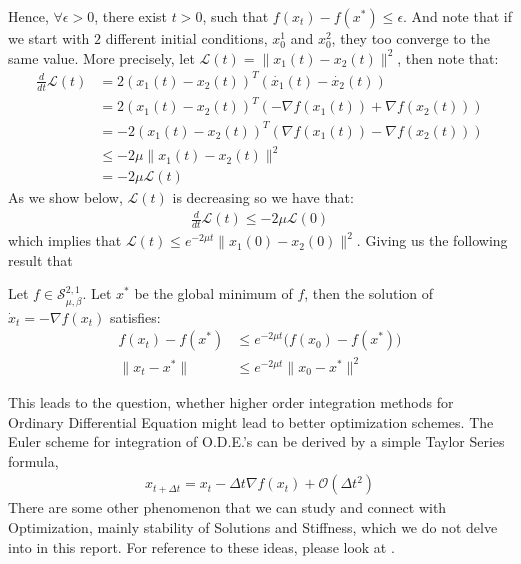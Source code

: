 Hence, $\forall \epsilon >0$, there exist $t>0$, such that $f(x_t) - f(x^*) \leq \epsilon$. And note that if we start with $2$ different initial conditions, $x_0^1$ and $x_0^2$, they too converge to the same value. More precisely, let $\mathcal{L}(t)= \| x_1 (t) - x_2 (t) \|^2$, then note that:
\begin{equation}
\begin{aligned}
\frac{d}{dt}\mathcal{L}(t) &= 2 (x_1(t) - x_2(t))^T (\dot{x_1}(t) - \dot{x_2}(t)) \\
&= 2 (x_1(t) - x_2(t))^T (-\nabla f(x_1(t)) + \nabla f(x_2(t))) \\
& = - 2 (x_1(t) - x_2(t))^T (\nabla f(x_1(t)) - \nabla f(x_2(t))) \\
& \leq - 2 \mu \| x_1(t) - x_2(t) \|^2 \\
&= -2 \mu \mathcal{L}(t)
\end{aligned}
\end{equation}
As we show below, $\mathcal{L}(t)$ is decreasing so we have that:
\begin{equation}
\begin{aligned}
\frac{d}{dt}\mathcal{L}(t) \leq - 2 \mu \mathcal{L}(0)
\end{aligned}
\end{equation}
which implies that $\mathcal{L}(t) \leq e^{-2 \mu t} \| x_1(0) - x_2(0) \|^2$. Giving us the following result that
\begin{prop}
Let $f \in \mathcal{S}_{\mu, \beta}^{2,1}$. Let $x^*$ be the global minimum of $f$, then the solution of $\dot{x}_t = -\nabla f(x_t)$ satisfies:
\begin{align*}
f(x_t) - f(x^*) &\leq e^{-2 \mu t} \big( f(x_0) - f(x^*) \big) \\
\| x_t - x^* \| &\leq e^{-2 \mu t} \| x_0 - x^* \|^2
\end{align*}
\end{prop}

This leads to the question, whether higher order integration methods for Ordinary Differential Equation might lead to better optimization schemes. The Euler scheme for integration of O.D.E.'s can be derived by a simple Taylor Series formula,
\begin{align*}
x_{t+ \Delta t} = x_t - \Delta t \nabla f(x_{t}) + \mathcal{O}(\Delta t^2)
\end{align*}
There are some other phenomenon that we can study and connect with Optimization, mainly stability of Solutions and Stiffness, which we do not delve into in this report. For reference to these ideas, please look at \cite{alex2017}.
